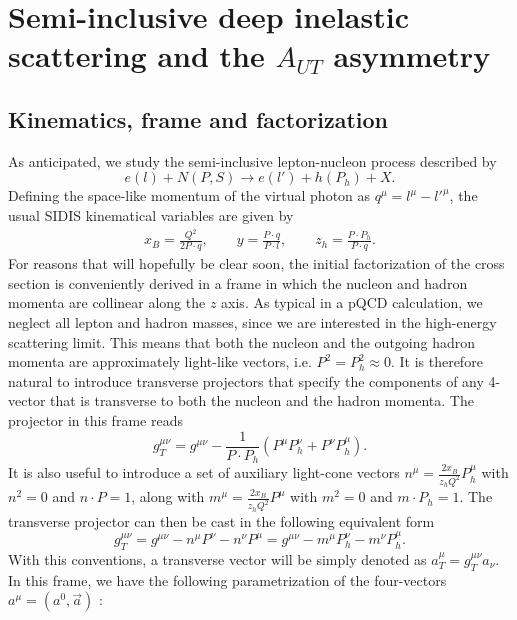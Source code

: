 
\chapter{Semi-inclusive deep inelastic scattering and the $A_{UT}$ asymmetry}
\section{Kinematics, frame and factorization}
\noindent As anticipated, we study the semi-inclusive lepton-nucleon process described by
\begin{equation}
    e(l)+N(P,S) \longrightarrow e(l')+h(P_h)+X .
\end{equation}
Defining the space-like momentum of the virtual photon as $q^\mu=l^\mu-l'^\mu$, the usual SIDIS kinematical variables are given by
\begin{equation}
    \begin{aligned}
        x_B=\frac{Q^2}{2P\cdot q},\qquad y=\frac{P\cdot q}{P\cdot l},\qquad z_h=\frac{P\cdot P_h}{P\cdot q}.
    \end{aligned}
\end{equation}
For reasons that will hopefully be clear soon, the initial factorization of the cross section is conveniently derived in a frame in which the nucleon and hadron momenta are collinear along the $z$ axis. As typical in a pQCD calculation, we neglect all lepton and hadron masses, since we are interested in the high-energy scattering limit. This means that both the nucleon and the outgoing hadron momenta are approximately light-like vectors, i.e. $P^2=P_h^2\approx0$. It is therefore natural to introduce transverse projectors that specify the components of any 4-vector that is transverse to both the nucleon and the hadron momenta. The projector in this frame reads
\begin{equation}
    g_T^{\mu\nu}=g^{\mu\nu}-\frac{1}{P\cdot P_h}(P^\mu P_h^\nu+P^\nu P_h^\mu).
\end{equation}
It is also useful to introduce a set of auxiliary light-cone vectors $n^\mu=\frac{2x_B}{z_hQ^2}P_h^\mu$ with $n^2=0$ and $n\cdot P=1$, along with $m^\mu=\frac{2x_B}{z_hQ^2}P^\mu$ with $m^2=0$ and $m\cdot P_h=1$. The transverse projector can then be cast in the following equivalent form
\begin{equation}
    g^{\mu\nu}_T=g^{\mu\nu}-n^\mu P^\nu - n^\nu P^\mu=g^{\mu\nu}-m^\mu P_h^\nu - m^\nu P_h^\mu.
\end{equation}
With this conventions, a transverse vector will be simply denoted as $a_T^\mu=g^{\mu\nu}_Ta_\nu$. In this frame, we have the following parametrization of the four-vectors $a^\mu=(a^0,\vec a)$ \cite{}:
